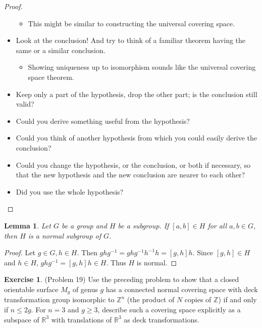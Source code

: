 \documentclass[12pt, psamsfonts]{amsart}
\newtheorem{lem}[thm]{Lemma}
\theoremstyle{definition}
\newtheorem*{exer}{Exercise}
\theoremstyle{remark}
\numberwithin{equation}{section}
\begin{document}
\begin{proof}
\begin{itemize}
    \begin{itemize}
      \item
        This might be similar to constructing the universal covering space.
    \end{itemize}
  \item Look at the conclusion! And try to think of a familiar theorem having the same or a similar conclusion.
    \begin{itemize}
      \item
        Showing uniqueness up to isomorphism sounds like the universal covering space theorem.
    \end{itemize}
  \item Keep only a part of the hypothesis, drop the other part; is the conclusion still valid?
  \item Could you derive something useful from the hypothesis?
  \item Could you think of another hypothesis from which you could easily derive the conclusion?
  \item Could you change the hypothesis, or the conclusion, or both if necessary, so that the new hypothesis and the new conclusion are nearer to each other?
  \item Did you use the whole hypothesis?
\end{itemize}
\end{proof}

\begin{lem}
  Let $G$ be a group and $H$ be a subgroup.
  If $[a, b] \in H$ for all $a, b \in G$, then $H$ is a normal subgroup of $G$.
\end{lem}

\begin{proof}
  Let $g \in G, h \in H$.
  Then $ghg^{-1} = ghg^{-1}h^{-1}h = [g, h]h$.
  Since $[g, h] \in H$ and $h \in H$, $ghg^{-1} = [g, h]h \in H$.
  Thus $H$ is normal.
\end{proof}

\begin{exer}{(Problem 19)}
  Use the preceding problem to show that a closed orientable surface $M_g$ of genus $g$ has a connected normal covering space with deck transformation group isomorphic to $\mathbb{Z}^n$ (the product of $N$ copies of $\mathbb{Z}$) if and only if $n \leq 2g$.
  For $n = 3$ and $g \geq 3$, describe such a covering space explicitly as a subspace of $\mathbb{R}^3$ with translations of $\mathbb{R}^3$ as deck transformations.
\end{exer}
\end{document}
